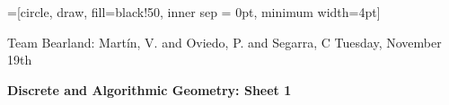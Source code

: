 \documentclass[a4paper, 10pt]{article}
\theoremstyle{definition} %
\begin{document}
=[circle, draw, fill=black!50, inner sep = 0pt, minimum width=4pt]

Team Bearland: Mart\'in, V. and Oviedo, P. and Segarra, C \hfill Tuesday, November 19th

\vspace{15pt}

\textbf{\Large Discrete and Algorithmic Geometry: Sheet 1}

\vspace{20pt}


\end{document}
